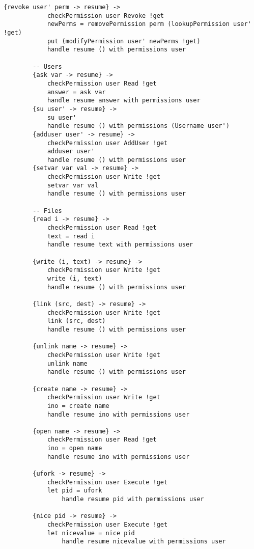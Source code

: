 \documentclass[logo,bsc,singlespacing,parskip]{infthesis}
\begin{document}
\begin{lstlisting}[language=unison]
        {revoke user' perm -> resume} ->
            checkPermission user Revoke !get
            newPerms = removePermission perm (lookupPermission user' !get)
            put (modifyPermission user' newPerms !get)
            handle resume () with permissions user

        -- Users
        {ask var -> resume} -> 
            checkPermission user Read !get
            answer = ask var
            handle resume answer with permissions user 
        {su user' -> resume} -> 
            su user'
            handle resume () with permissions (Username user')
        {adduser user' -> resume} -> 
            checkPermission user AddUser !get
            adduser user'
            handle resume () with permissions user
        {setvar var val -> resume} -> 
            checkPermission user Write !get
            setvar var val
            handle resume () with permissions user

        -- Files
        {read i -> resume} -> 
            checkPermission user Read !get
            text = read i
            handle resume text with permissions user

        {write (i, text) -> resume} -> 
            checkPermission user Write !get
            write (i, text)
            handle resume () with permissions user
        
        {link (src, dest) -> resume} -> 
            checkPermission user Write !get
            link (src, dest)
            handle resume () with permissions user
        
        {unlink name -> resume} ->
            checkPermission user Write !get
            unlink name
            handle resume () with permissions user

        {create name -> resume} -> 
            checkPermission user Write !get
            ino = create name
            handle resume ino with permissions user

        {open name -> resume} ->
            checkPermission user Read !get
            ino = open name
            handle resume ino with permissions user

        {ufork -> resume} ->
            checkPermission user Execute !get
            let pid = ufork
                handle resume pid with permissions user

        {nice pid -> resume} ->
            checkPermission user Execute !get
            let nicevalue = nice pid
                handle resume nicevalue with permissions user


\end{lstlisting}
\end{document}
